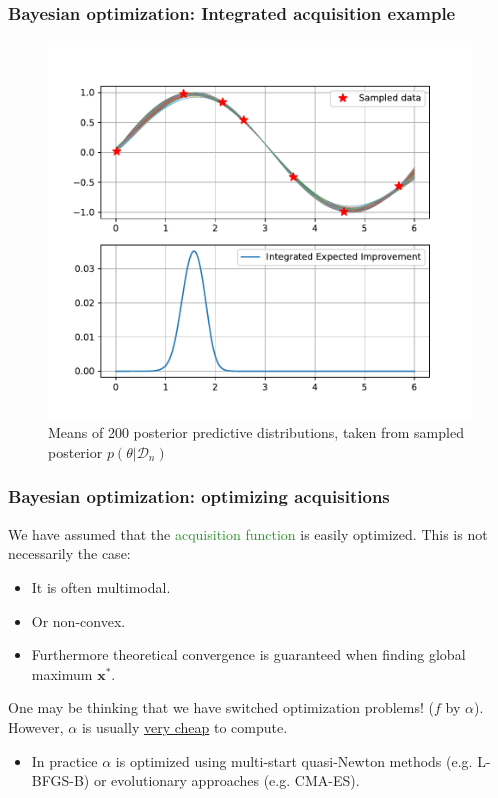 \documentclass[10pt,usenames,dvipsnames]{beamer}
\begin{document}
		\begin{frame}
		\frametitle{Bayesian optimization: Integrated acquisition example}
		\begin{figure}
		\caption{Means of 200 posterior predictive distributions, taken from sampled posterior $p(\theta|\mathcal{D}_n)$}
		\includegraphics[scale=0.4]{../figures/chapter3/integratedacq}
		\end{figure}
		\end{frame}
		
		\begin{frame}
		\frametitle{Bayesian optimization: optimizing acquisitions}
		We have assumed that the \textcolor{ForestGreen}{acquisition function} is easily optimized. This is not necessarily the case:
		
		\begin{itemize}
		\item It is often multimodal.
		\item Or non-convex.
		\item Furthermore theoretical convergence is guaranteed when finding global maximum $\boldsymbol{x}^{*}$.
		\end{itemize}
		
		One may be thinking that we have switched optimization problems! ($f$ by $\alpha$). However, $\alpha$ is usually \underline{very cheap} to compute.\\
		\begin{itemize}
		\item In practice $\alpha$ is optimized using multi-start quasi-Newton methods (e.g. L-BFGS-B) or 	evolutionary approaches (e.g. CMA-ES).
		\end{itemize}
		\end{frame}
		
\end{document}
